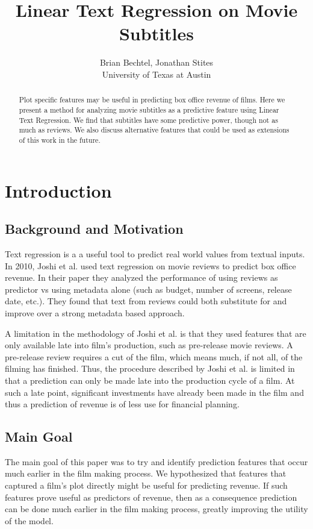 \documentclass[11pt]{article}
\begin{document}
\title{Linear Text Regression on Movie Subtitles}
\author{Brian Bechtel, Jonathan Stites\\
       University of Texas at Austin}
\date{}

\maketitle

\begin{abstract}
\noindent
Plot specific features may be useful in predicting box office revenue of films.
Here we present a method for analyzing movie subtitles as a predictive
feature using Linear Text Regression. We find that subtitles have some predictive
power, though not as much as reviews.
We also discuss alternative features that could be used as extensions of this work 
in the future.
\end{abstract}

\section{Introduction}
\subsection{Background and Motivation}
Text regression is a a useful tool to predict real world values from textual inputs.
In 2010, Joshi et al. used text regression on movie reviews to predict box office revenue.
In their paper they analyzed the performance of using reviews as predictor vs using metadata 
alone (such as budget, number of screens, release date, etc.). They found that text
from reviews could both substitute for and improve over a strong metadata based approach.

A limitation in the methodology of Joshi et al. is that they used features that are only
available late into film's production, such as pre-release movie reviews. A pre-release
review requires a cut of the film, which means much, if not all, of the filming has
finished. Thus, the procedure described by Joshi et al. is limited in that a prediction
can only be made late into the production cycle of a film. At such a late point,
significant investments have already been made in the film and thus a prediction of
revenue is of less use for financial planning.

\subsection{Main Goal}
The main goal of this paper was to try and identify prediction features that occur much
earlier in the film making process. We hypothesized that features that captured a film's
plot directly might be useful for predicting revenue. If such features prove useful as
predictors of revenue, then as a consequence prediction can be done much earlier in the
film making process, greatly improving the utility of the model.
\end{document}
